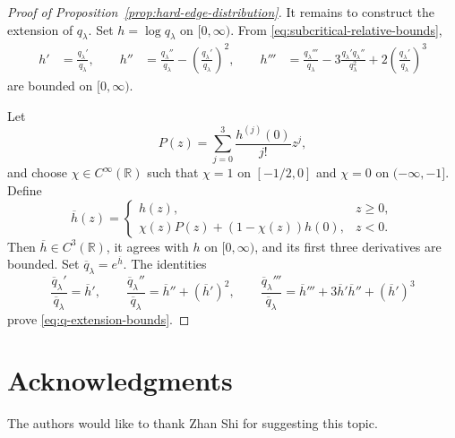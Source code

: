 \documentclass[12pt,preprint]{amsart}
\numberwithin{equation}{section}
\theoremstyle{plain}
\theoremstyle{definition}
\begin{document}
\begin{proof}[Proof of Proposition~\ref{prop:hard-edge-distribution}]
It remains to construct the extension of $q_{\lambda}$.  Set
$h=\log q_{\lambda}$ on $[0,\infty)$.  From
\eqref{eq:subcritical-relative-bounds},
\[
\begin{aligned}
 h'&=\frac{q_{\lambda}'}{q_{\lambda}},\qquad
 h''&=\frac{q_{\lambda}''}{q_{\lambda}}
      -\left(\frac{q_{\lambda}'}{q_{\lambda}}\right)^2,\qquad
 h'''&=\frac{q_{\lambda}'''}{q_{\lambda}}
      -3\frac{q_{\lambda}'q_{\lambda}''}{q_{\lambda}^2}
      +2\left(\frac{q_{\lambda}'}{q_{\lambda}}\right)^3
\end{aligned}
\]
are bounded on $[0,\infty)$.

 Let
\[
 P(z)=\sum_{j=0}^3\frac{h^{(j)}(0)}{j!}z^j,
\]
and choose $\chi\in C^\infty(\mathbb R)$ such that
$\chi=1$ on $[-1/2,0]$ and $\chi=0$ on $(-\infty,-1]$.  Define
\[
 \overline h(z)=
 \begin{cases}
  h(z),&z\ge0,\\
  \chi(z)P(z)+(1-\chi(z))h(0),&z<0.
 \end{cases}
\]
Then $\overline h\in C^3(\mathbb R)$, it agrees with $h$ on
$[0,\infty)$, and its first three derivatives are bounded.  Set
$\overline q_{\lambda}=e^{\overline h}$.  The identities
\[
 {
 \frac{\overline q_{\lambda}'}{\overline q_{\lambda}}
 =\overline h',
 \qquad
 \frac{\overline q_{\lambda}''}{\overline q_{\lambda}}
 =\overline h''+(\overline h')^2,
 \qquad
 \frac{\overline q_{\lambda}'''}{\overline q_{\lambda}}
 =\overline h'''+3\overline h'\overline h''+(\overline h')^3}
\]
prove \eqref{eq:q-extension-bounds}.
\end{proof}

\section*{Acknowledgments}
The authors would like to thank Zhan Shi for suggesting this topic.

%
%
%
%
%
%
%
%
%
%
%
%
%
%
%
%
%
%
%
%
%
%
%
%
%
%
%
%
%
\end{document}
